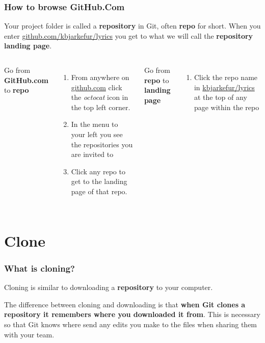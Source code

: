 \documentclass[aspectratio=169]{beamer} %
\newcommand{\trainingURL}[1]{{\color{blue}\url{#1}}}
\newcommand{\traininerUsername}{kbjarkefur}
\newcommand{\repoName}{\traininerUsername/lyrics}
\newcommand{\trainingRepoURL}[1]{\trainingURL{github.com/\repoName #1}}
\begin{document}
\begin{frame}
\frametitle{How to browse GitHub.Com}

	Your project folder is called a \textbf{repository} in Git, often \textbf{repo} for short.
	When you enter \trainingRepoURL{} you get to what we will call the \textbf{repository landing page}.

	\vspace{.5cm}

	\begin{columns}[T]

		Go from \textbf{GitHub.com} to \textbf{repo}
		\begin{enumerate}
			\item From anywhere on \trainingURL{github.com} click the \textit{octocat} icon in the top left corner.
			\item In the menu to your left you see the repositories you are invited to
			\item Click any repo to get to the landing page of that repo.
		\end{enumerate}

		Go from \textbf{repo} to \textbf{landing page}
		\begin{enumerate}
			\item Click the repo name in {\color{blue}\url{\repoName}} at the top of any page within the repo
		\end{enumerate}

	\end{columns}
\end{frame}

\section{Clone}

\begin{frame}
\frametitle{What is cloning?}

	Cloning is similar to downloading a \textbf{repository} to your computer.

	\vspace{.5cm}

	The difference between cloning and downloading is that \textbf{when Git clones a repository it remembers where you downloaded it from}. This is necessary so that Git knows where send any edits you make to the files when sharing them with your team.

\end{frame}
\end{document}
